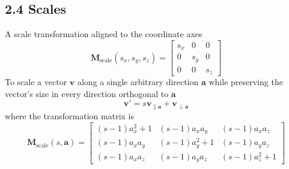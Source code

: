 \documentclass[11pt]{article}
\newcommand{\bm}[1]{\mathbf{#1}}
\DeclareMathOperator{\scale}{scale}
\begin{document}
\subsection*{2.4 Scales}
A scale transformation aligned to the coordinate axes
\begin{equation}
    \bm{M}_{\scale} \left(s_x, s_y, s_z\right) = \begin{bmatrix}
        s_x & 0 & 0 \\
        0 & s_y & 0 \\
        0 & 0 & s_z
    \end{bmatrix}
\end{equation}
To scale a vector $\bm{v}$ along a single arbitrary direction $\bm{a}$ while preserving the vector's
size in every direction orthogonal to $\bm{a}$
\begin{equation}
    \bm{v}' = s\bm{v}_{\parallel \bm{a}} + \bm{v}_{\perp \bm{a}}
\end{equation}
where the transformation matrix is
\begin{equation}
    \bm{M}_{\scale} \left(s, \bm{a}\right) = \begin{bmatrix}
        (s-1)a_x^2 + 1 & (s-1)a_xa_y & (s-1)a_xa_z \\
        (s-1)a_xa_y & (s-1)a_y^2 + 1 & (s-1)a_ya_z \\
        (s-1)a_xa_z & (s-1)a_ya_z & (s-1)a_z^2 + 1
    \end{bmatrix}
\end{equation}
\end{document}
